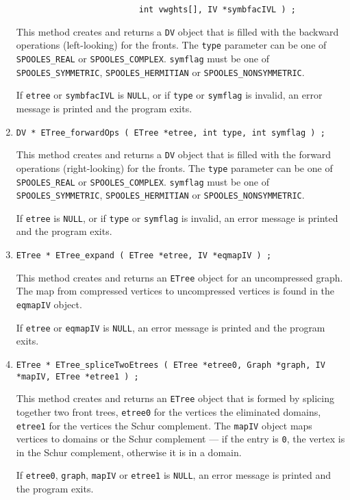\begin{enumerate}
\begin{verbatim}
                         int vwghts[], IV *symbfacIVL ) ;
\end{verbatim}
This method creates and returns a {\tt DV} object that is filled
with the backward operations (left-looking) for the fronts.
The {\tt type} parameter can be one of {\tt SPOOLES\_REAL} or
{\tt SPOOLES\_COMPLEX}.
{\tt symflag} must be one of {\tt SPOOLES\_SYMMETRIC},
{\tt SPOOLES\_HERMITIAN} or {\tt SPOOLES\_NONSYMMETRIC}.
\par {}
If {\tt etree} or {\tt symbfacIVL} is {\tt NULL},
or if {\tt type} or {\tt symflag} is invalid,
an error message is printed and the program exits.
\item
\begin{verbatim}
DV * ETree_forwardOps ( ETree *etree, int type, int symflag ) ;
\end{verbatim}
This method creates and returns a {\tt DV} object that is filled
with the forward operations (right-looking) for the fronts.
The {\tt type} parameter can be one of {\tt SPOOLES\_REAL} or
{\tt SPOOLES\_COMPLEX}.
{\tt symflag} must be one of {\tt SPOOLES\_SYMMETRIC},
{\tt SPOOLES\_HERMITIAN} or {\tt SPOOLES\_NONSYMMETRIC}.
\par {}
If {\tt etree} is {\tt NULL},
or if {\tt type} or {\tt symflag} is invalid,
an error message is printed and the program exits.
\item
\begin{verbatim}
ETree * ETree_expand ( ETree *etree, IV *eqmapIV ) ;
\end{verbatim}
This method creates and returns an {\tt ETree} object 
for an uncompressed graph.
The map from compressed vertices to uncompressed vertices
is found in the {\tt eqmapIV} object.
\par {}
If {\tt etree} or {\tt eqmapIV} is {\tt NULL},
an error message is printed and the program exits.
\item
\begin{verbatim}
ETree * ETree_spliceTwoEtrees ( ETree *etree0, Graph *graph, IV *mapIV, ETree *etree1 ) ;
\end{verbatim}
This method creates and returns an {\tt ETree} object that is
formed by splicing together two front trees, 
{\tt etree0} for the vertices the eliminated domains,
{\tt etree1} for the vertices the Schur complement.
The {\tt mapIV} object maps vertices to domains or the Schur
complement --- if the entry is {\tt 0}, the vertex is in the Schur
complement, otherwise it is in a domain.
\par {}
If {\tt etree0}, {\tt graph}, {\tt mapIV} or {\tt etree1} is {\tt NULL},
an error message is printed and the program exits.
\end{enumerate}
